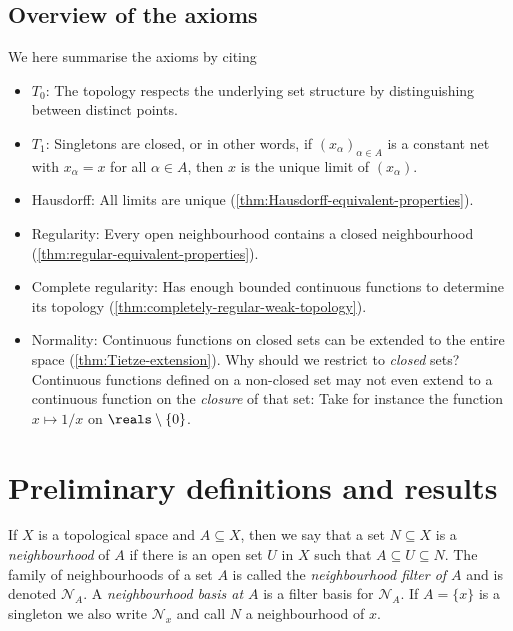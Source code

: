 \documentclass[article, a4paper, 11pt, oneside]{memoir}
\numberwithin{equation}{chapter}
\newcommand{\calN}{\mathcal{N}}
\newcommand{\nhoodfilter}[1]{\calN_{#1}}
\begin{document}
\section{Overview of the axioms}

We here summarise the axioms by citing

\begin{itemize}
    \item $T_0$: The topology respects the underlying set structure by distinguishing between distinct points.
    
    \item $T_1$: Singletons are closed, or in other words, if $(x_\alpha)_{\alpha \in A}$ is a constant net with $x_\alpha = x$ for all $\alpha \in A$, then $x$ is the unique limit of $(x_\alpha)$.
    
    \item Hausdorff: All limits are unique (\cref{thm:Hausdorff-equivalent-properties}).
    
    \item Regularity: Every open neighbourhood contains a closed neighbourhood (\cref{thm:regular-equivalent-properties}).
    
    \item Complete regularity: Has enough bounded continuous functions to determine its topology (\cref{thm:completely-regular-weak-topology}).
    
    \item Normality: Continuous functions on closed sets can be extended to the entire space (\cref{thm:Tietze-extension}). Why should we restrict to \emph{closed} sets? Continuous functions defined on a non-closed set may not even extend to a continuous function on the \emph{closure} of that set: Take for instance the function $x \mapsto 1/x$ on $\reals \setminus \{0\}$.
\end{itemize}


\chapter{Preliminary definitions and results}


If $X$ is a topological space and $A \subseteq X$, then we say that a set $N \subseteq X$ is a \emph{neighbourhood} of $A$ if there is an open set $U$ in $X$ such that $A \subseteq U \subseteq N$. The family of neighbourhoods of a set $A$ is called the \emph{neighbourhood filter of $A$} and is denoted $\nhoodfilter{A}$. A \emph{neighbourhood basis at $A$} is a filter basis for $\nhoodfilter{A}$. If $A = \{x\}$ is a singleton we also write $\nhoodfilter{x}$ and call $N$ a neighbourhood of $x$.
\end{document}
